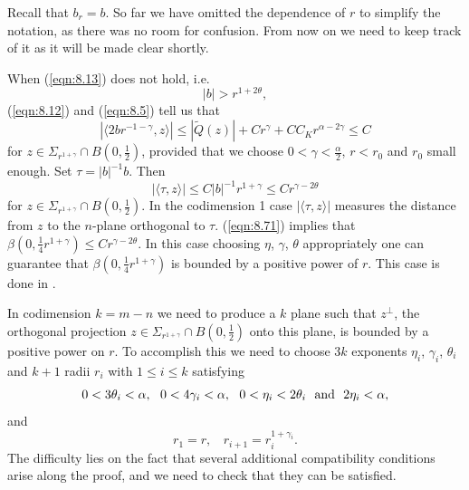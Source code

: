 \documentclass[12pt,leqno]{article}
\theoremstyle{plain}
\numberwithin{equation}{section}
\begin{document}
Recall that $b_r=b$. So far we have omitted the dependence of $r$ to simplify
the notation, as there was no room for confusion. From now on we need
to keep track of it as it will be made clear shortly.


When (\ref{eqn:8.13}) does not hold, i.e.
\begin{equation}\label{eqn:8.69}
|b|>r^{1+2\theta},
\end{equation}
(\ref{eqn:8.12}) and (\ref{eqn:8.5}) tell us that
\begin{equation}\label{eqn:8.70}
|\langle 2br^{-1-\gamma}, z\rangle| \le |\widetilde Q(z)|+Cr^\gamma+CC_K
r^{\alpha-2\gamma}\le C
\end{equation}
for $z\in\Sigma_{r^{1+\gamma}}\cap B(0, \frac{1}{2})$, provided that we choose
$0<\gamma<\frac{\alpha}{2}$, $r<r_0$ and $r_0$ small enough.
Set $\tau=|b|^{-1}b$. Then
\begin{equation}\label{eqn:8.71}
|\langle \tau,z\rangle|\le C|b|^{-1}r^{1+\gamma}\le Cr^{\gamma-2\theta}
\end{equation}
for $z\in\Sigma_{r^{1+\gamma}}\cap B(0, \frac{1}{2})$.
In the codimension 1 case $|\langle \tau,z\rangle|$
measures the distance from $z$ to the $n$-plane orthogonal to $\tau$.
(\ref{eqn:8.71}) implies that
$\beta(0, \frac{1}{4}r^{1+\gamma})\le Cr^{\gamma-2\theta}.$
In this case choosing $\eta$, $\gamma$, $\theta$ appropriately
one can guarantee that
$\beta(0, \frac{1}{4}r^{1+\gamma})$ is bounded by a positive
power of $r$. This case is done in \cite{DKT}.

In codimension
$k=m-n$ we need to
produce a $k$ plane such that $z^{\perp}$, the orthogonal projection
$z\in\Sigma_{r^{1+\gamma}}\cap B(0, \frac{1}{2})$ onto this plane, is
bounded by a positive power on $r$.
To accomplish this we need to choose
$3k$ exponents $\eta_i$, $\gamma_i$, $\theta_i$ and $k+1$ radii $r_i$
with $1\le i\le k$
satisfying
\begin{equation}\label{eqn:001}
0<3\theta_i<\alpha,\ \
0<4\gamma_i<\alpha,\ \ 0<\eta_i<2\theta_i\ \hbox{ and }\ 2\eta_i<\alpha,
\end{equation}
and
\begin{equation}\label{eqn:002}
r_1=r,\ \ \ \ r_{i+1}=r_i^{1+\gamma_i}.
\end{equation}
The difficulty lies on the fact that several additional
compatibility conditions arise along the proof, and we need to check that
they can be satisfied.
\end{document}
